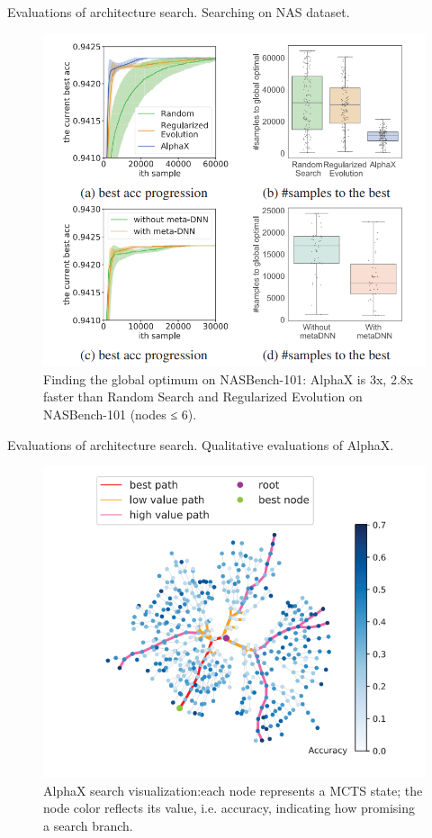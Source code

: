 \documentclass{beamer}
\begin{document}
\begin{frame}{Evaluations of architecture search. Searching on NAS dataset.}
    \begin{figure}
        \centering
        \includegraphics[scale=0.45]{images/nas7.png}
        \caption{Finding the global optimum on NASBench-101:
AlphaX is 3x, 2.8x faster than Random Search and Regularized Evolution on NASBench-101 (nodes ≤ 6).}
    \end{figure}
\end{frame}

\begin{frame}{Evaluations of architecture search. Qualitative evaluations of AlphaX.}
    \begin{figure}
        \centering
        \includegraphics[scale=0.55]{images/nas9.png}
        \caption{ AlphaX search visualization:each node represents
a MCTS state; the node color reflects its value, i.e. accuracy,
indicating how promising a search branch.}
    \end{figure}
\end{frame}
\end{document}
